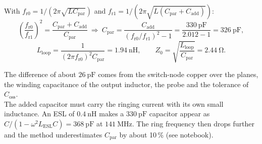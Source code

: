 
\begin{solutionblock}
	With $f_\mathrm{r0}=1/(2\pi\sqrt{LC_\mathrm{par}})$ and $f_\mathrm{r1}=1/(2\pi\sqrt{L(C_\mathrm{par}+C_\mathrm{add})})$:
	\begin{equation}
		\left(\frac{f_\mathrm{r0}}{f_\mathrm{r1}}\right)^2 = \frac{C_\mathrm{par}+C_\mathrm{add}}{C_\mathrm{par}}\ \Rightarrow\
		C_\mathrm{par} = \frac{C_\mathrm{add}}{(f_\mathrm{r0}/f_\mathrm{r1})^2-1} = \frac{\SI{330}{\pico\farad}}{2.012-1} = \SI{326}{\pico\farad},
	\end{equation}
	\begin{equation}
		L_\mathrm{loop} = \frac{1}{(2\pi f_\mathrm{r0})^2C_\mathrm{par}} = \SI{1.94}{\nano\henry},\qquad
		Z_0 = \sqrt{\frac{L_\mathrm{loop}}{C_\mathrm{par}}} = \SI{2.44}{\ohm}.
	\end{equation}
\end{solutionblock}


\begin{solutionblock}
	The difference of about $\SI{26}{\pico\farad}$ comes from the switch-node copper over the planes, the winding capacitance of the output inductor, the probe and the tolerance of $C_\mathrm{oss}$.\\
	The added capacitor must carry the ringing current with its own small inductance. An ESL of $\SI{0.4}{\nano\henry}$ makes a $\SI{330}{\pico\farad}$ capacitor appear as $C/(1-\omega^2L_\mathrm{ESL}C)=\SI{368}{\pico\farad}$ at $\SI{141}{\mega\hertz}$. The ring frequency then drops further and the method underestimates $C_\mathrm{par}$ by about 10\,\% (see notebook).
\end{solutionblock}


